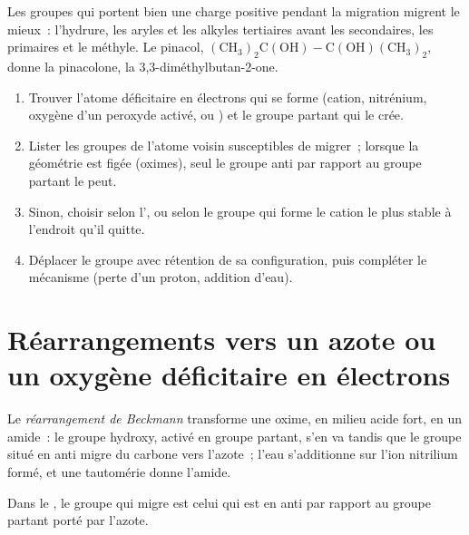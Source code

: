 Les groupes qui portent bien une charge positive pendant la migration
migrent le mieux~: l'hydrure, les aryles et les alkyles tertiaires avant
les secondaires, les primaires et le méthyle. Le pinacol,
$\mathrm{(CH_3)_2C(OH){-}C(OH)(CH_3)_2}$, donne la pinacolone, la 3,3-diméthylbutan-2-one.

\begin{method}\label{met:b3:radicals-carbenes:rearrangement}
\begin{enumerate}
  \item Trouver l'atome déficitaire en électrons qui se forme (cation,
        nitrénium, oxygène d'un peroxyde activé,  ou ) et le
        groupe partant qui le crée.
  \item Lister les groupes de l'atome voisin susceptibles de migrer~;
        lorsque la géométrie est figée (oximes), seul le groupe anti par
        rapport au groupe partant le peut.
  \item Sinon, choisir selon l', ou selon le groupe qui
        forme le cation le plus stable à l'endroit qu'il quitte.
  \item Déplacer le groupe avec rétention de sa configuration, puis
        compléter le mécanisme (perte d'un proton, addition d'eau).
\end{enumerate}
\end{method}

\section{Réarrangements vers un azote ou un oxygène déficitaire en électrons}

\begin{definition}\label{def:b3:radicals-carbenes:beckmann}
Le \emph{réarrangement de Beckmann} transforme une
oxime, en milieu acide fort, en un amide~: le groupe hydroxy, activé en
groupe partant, s'en va tandis que le groupe situé en anti migre du carbone
vers l'azote~; l'eau s'additionne sur l'ion nitrilium formé, et une
tautomérie donne l'amide.
\end{definition}

\begin{proposition}\label{prop:b3:radicals-carbenes:beckmann-anti}
Dans le , le groupe qui migre est celui qui est
en anti par rapport au groupe partant porté par l'azote.
\end{proposition}


